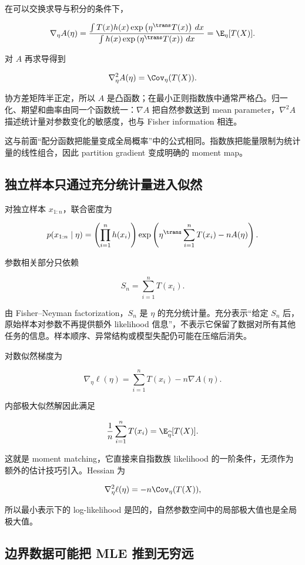 在可以交换求导与积分的条件下，

\[
\nabla_\eta A(\eta)
=\frac{
\int T(x)h(x)
\exp\left(
\eta^{\trans}T(x)
\right)\,dx
}{
\int h(x)
\exp\left(
\eta^{\trans}T(x)
\right)\,dx
}
=\E_\eta[T(X)].
\]

对 \(A\) 再求导得到

\[
\nabla_\eta^2 A(\eta)
=\Cov_\eta(T(X)).
\]

协方差矩阵半正定，所以 \(A\) 是凸函数；在最小正则指数族中通常严格凸。归一化、期望和曲率由同一个函数统一：\(\nabla A\) 把自然参数送到 mean parameter，\(\nabla^2A\) 描述统计量对参数变化的敏感度，也与 Fisher information 相连。

这与前面“配分函数把能量变成全局概率”中的公式相同。指数族把能量限制为统计量的线性组合，因此 partition gradient 变成明确的 moment map。

\subsection{独立样本只通过充分统计量进入似然}

对独立样本 \(x_{1:n}\)，联合密度为

\[
p(x_{1:n}\mid\eta)
=\left(\prod_{i=1}^{n}h(x_i)\right)
\exp\left(
\eta^{\trans}\sum_{i=1}^{n}T(x_i)
-nA(\eta)
\right).
\]

参数相关部分只依赖

\[
S_n=\sum_{i=1}^{n}T(x_i).
\]

由 Fisher--Neyman factorization，\(S_n\) 是 \(\eta\) 的充分统计量。充分表示“给定 \(S_n\) 后，原始样本对参数不再提供额外 likelihood 信息”，不表示它保留了数据对所有其他任务的信息。样本顺序、异常结构或模型失配仍可能在压缩后消失。

对数似然梯度为

\[
\nabla_\eta\ell(\eta)
=\sum_{i=1}^{n}T(x_i)
-n\nabla A(\eta).
\]

内部极大似然解因此满足

\[
\frac1n\sum_{i=1}^{n}T(x_i)
=\E_{\widehat\eta}[T(X)].
\]

这就是 moment matching，它直接来自指数族 likelihood 的一阶条件，无须作为额外的估计技巧引入。Hessian 为

\[
\nabla_\eta^2\ell(\eta)
=-n\Cov_\eta(T(X)),
\]

所以最小表示下的 log-likelihood 是凹的，自然参数空间中的局部极大值也是全局极大值。

\subsection{边界数据可能把 MLE 推到无穷远}

